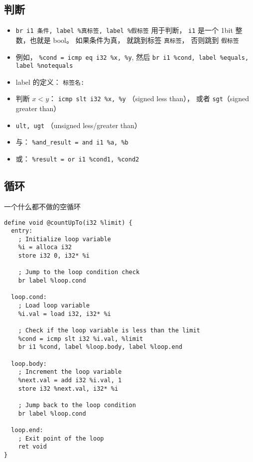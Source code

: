 \subsection{判断}
\begin{itemize}
\item \verb`br i1 条件, label %真标签, label %假标签` 用于判断， \verb`i1` 是一个 1bit 整数，也就是 bool。 如果条件为真， 就跳到标签 \verb`真标签`， 否则跳到 \verb`假标签`
\item 例如， \verb`%cond = icmp eq i32 %x, %y`, 然后 \verb`br i1 %cond, label %equals, label %notequals`
\item label 的定义： \verb`标签名:`
\item 判断 $x < y$： \verb`icmp slt i32 %x, %y` （signed less than）， 或者 \verb`sgt`（signed greater than）
\item \verb`ult, ugt` （unsigned less/greater than）
\item 与： \verb`%and_result = and i1 %a, %b`
\item 或： \verb`%result = or i1 %cond1, %cond2`
\end{itemize}


\subsection{循环}
一个什么都不做的空循环
\begin{lstlisting}[language=none]
define void @countUpTo(i32 %limit) {
  entry:
    ; Initialize loop variable
    %i = alloca i32
    store i32 0, i32* %i

    ; Jump to the loop condition check
    br label %loop.cond

  loop.cond:
    ; Load loop variable
    %i.val = load i32, i32* %i

    ; Check if the loop variable is less than the limit
    %cond = icmp slt i32 %i.val, %limit
    br i1 %cond, label %loop.body, label %loop.end

  loop.body:
    ; Increment the loop variable
    %next.val = add i32 %i.val, 1
    store i32 %next.val, i32* %i

    ; Jump back to the loop condition
    br label %loop.cond

  loop.end:
    ; Exit point of the loop
    ret void
}
\end{lstlisting}

